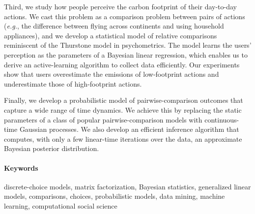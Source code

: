 Third, we study how people perceive the carbon footprint of their day-to-day actions.
We cast this problem as a comparison problem between pairs of actions (\textit{e.g.}, the difference between flying across continents and using household appliances), and we develop a statistical model of relative comparisons reminiscent of the Thurstone model in psychometrics.
The model learns the users’ perception as the parameters of a Bayesian linear regression, which enables us to derive an active-learning algorithm to collect data efficiently.
Our experiments show that users overestimate the emissions of low-footprint actions and underestimate those of high-footprint actions.

Finally, we develop a probabilistic model of pairwise-comparison outcomes that capture a wide range of time dynamics.
We achieve this by replacing the static parameters of a class of popular pairwise-comparison models with continuous-time Gaussian processes.
We also develop an efficient inference algorithm that computes, with only a few linear-time iterations over the data, an approximate Bayesian posterior distribution.

\paragraph{Keywords}
discrete-choice models, matrix factorization, Bayesian statistics, generalized linear models, comparisons, choices, probabilistic models, data mining, machine learning, computational social science

\cleardoublepage

